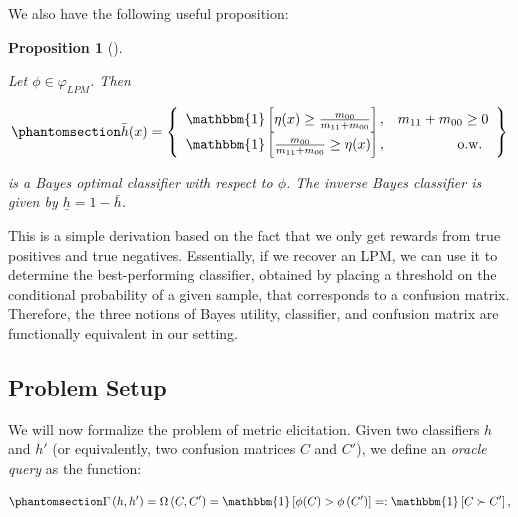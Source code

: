 \documentclass[
  letterpaper,
  numbers=noenddot,
  DIV=11]{scrreprt}
\theoremstyle{definition}
\theoremstyle{plain}
\newtheorem{proposition}{Proposition}[chapter]
\theoremstyle{plain}
\theoremstyle{remark}
\begin{document}
We also have the following useful proposition:

\begin{tcolorbox}[colframe=.grey, title=\faPenSquare \enspace Proposition]

\begin{proposition}[]\protect\hypertarget{prp-prp3.1}{}\label{prp-prp3.1}

Let \(\phi \in \varphi_{LPM}\). Then

\begin{equation}\phantomsection\label{eq-eq3.46}{\bar{h}(x) = \left\{\begin{array}{lr}
\mathbbm{1}\left[\eta(x) \geq \frac{m_{00}}{m_{11} + m_{00}}\right], & m_{11} + m_{00} \geq 0 \\
\mathbbm{1}\left[\frac{m_{00}}{m_{11} + m_{00}} \geq \eta(x)\right], & \text { o.w. }
\end{array}\right\}}\end{equation}

is a Bayes optimal classifier with respect to \(\phi\). The inverse
Bayes classifier is given by \(\underline{h} = 1 - \bar{h}\).

\end{proposition}

\end{tcolorbox}

This is a simple derivation based on the fact that we only get rewards
from true positives and true negatives. Essentially, if we recover an
LPM, we can use it to determine the best-performing classifier, obtained
by placing a threshold on the conditional probability of a given sample,
that corresponds to a confusion matrix. Therefore, the three notions of
Bayes utility, classifier, and confusion matrix are functionally
equivalent in our setting.

\subsection{Problem Setup}\label{sec-metric-elicitation-setup}

We will now formalize the problem of metric elicitation. Given two
classifiers \(h\) and \(h'\) (or equivalently, two confusion matrices
\(C\) and \(C'\)), we define an \emph{oracle query} as the function:

\begin{equation}\phantomsection\label{eq-oracle}{\Gamma\left(h, h^{\prime}\right)=\Omega\left(C, C^{\prime}\right)=\mathbbm{1}\left[\phi(C)>\phi\left(C^{\prime}\right)\right]=: \mathbbm{1} \left[C \succ C^{\prime}\right],}\end{equation}
\end{document}
